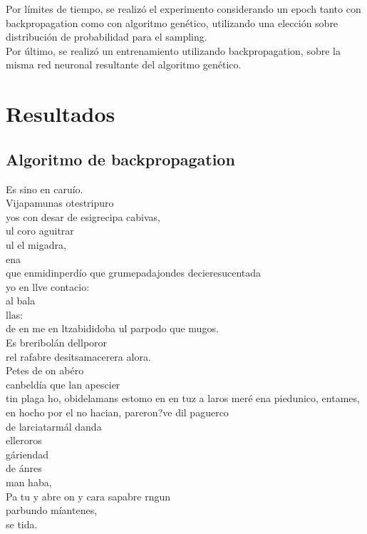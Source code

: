 \documentclass[11pt,letterpaper]{article}
\begin{document}
Por límites de tiempo, se realizó el experimento considerando un epoch tanto con backpropagation como 
con algoritmo genético, utilizando una elección sobre distribución de probabilidad para el sampling.\\

Por último, se realizó un entrenamiento utilizando backpropagation, sobre la misma red neuronal resultante 
del algoritmo genético.

\section{Resultados}
\subsection{Algoritmo de backpropagation}

\begin{center}
\parbox{0.5\linewidth}{
Es sino en caruío.\\

Vijapamunas otestripuro\\
yos con desar de esigrecipa cabivas,\\
ul coro aguitrar\\
ul el migadra,\\
ena\\
que enmidinperdío que grumepadajondes decieresucentada\\
yo en llve contacio:\\
al bala\\
llas:\\
de en me en ltzabididoba ul parpodo que mugos.\\

Es breribolán dellporor\\
rel rafabre desitsamacerera alora.\\

Petes de on abéro\\
canbeldía que lan apescier\\
tin plaga ho, obidelamans estomo en en tuz a laros meré ena piedunico, entames, en hocho por el no hacian, pareron?ve dil paguerco\\
de larciatarmál danda\\
elleroros\\
gáriendad\\
de ánres\\
man haba,\\
Pa tu y abre on y cara sapabre rngun\\
parbundo míantenes,\\
se tida.
}
\end{center}
\end{document}

